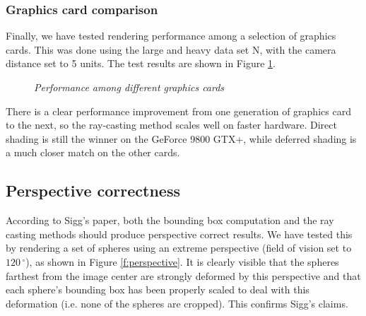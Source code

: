 \subsubsection*{Graphics card comparison}

Finally, we have tested rendering performance among a selection of graphics cards.
This was done using the large and heavy data set N, with the camera distance set to 5 units.
The test results are shown in Figure \ref{f:graka}.

\begin{figure}[!ht]
\centering
{}
\caption{\em Performance among different graphics cards}
\label{f:graka}
\end{figure}

There is a clear performance improvement from one generation of graphics card to the next, 
so the ray-casting method scales well on faster hardware.
Direct shading is still the winner on the GeForce 9800 GTX+, while deferred shading is a much closer match on the other cards.

\subsection*{Perspective correctness}

According to Sigg's paper, both the bounding box computation and the ray casting methods should produce perspective correct results.
We have tested this by rendering a set of spheres using an extreme perspective (field of vision set to $120\,^{\circ}$), as shown in Figure \ref{f:perspective}.
It is clearly visible that the spheres farthest from the image center are strongly deformed by this perspective and that each sphere's bounding box has been
properly scaled to deal with this deformation (i.e. none of the spheres are cropped). This confirms Sigg's claims.

